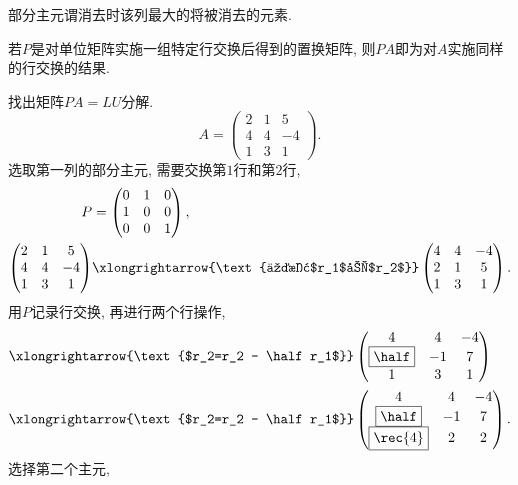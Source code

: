 \documentclass[20pt]{extarticle}
\begin{document}
\begin{definition}
    部分主元谓消去时该列最大的将被消去的元素.
\end{definition}
\begin{theorem}
    若$P$是对单位矩阵实施一组特定行交换后得到的置换矩阵, 则$PA$即为对$A$实施同样的行交换的结果.
\end{theorem}
\begin{ex}
    找出矩阵$PA=LU$分解.
    \[ A = \begin{pmatrix}
        2 & 1 & 5 \\ 4 & 4 & -4 \\ 1 & 3 & 1
    \end{pmatrix}. \]
    选取第一列的部分主元, 需要交换第$1$行和第$2$行,
    \begin{align*}
        P &= \begin{pmatrix}
            0 & 1 & 0 \\ 1 & 0 & 0 \\ 0 & 0 & 1
        \end{pmatrix}, \\
        \begin{pmatrix}
            2 & 1 & 5 \\ 4 & 4 & -4 \\ 1 & 3 & 1
        \end{pmatrix} &\xlongrightarrow{\text{交换$r_1$和$r_2$}} \begin{pmatrix}
            4 & 4 & -4 \\ 2 & 1 & 5 \\ 1 & 3 & 1
        \end{pmatrix}.
    \end{align*}
    用$P$记录行交换, 再进行两个行操作,
    \begin{align*}
        & \xlongrightarrow{\text{$r_2=r_2 - \half r_1$}} \begin{pmatrix}
            4 & 4 & -4 \\ \boxed{\half} & -1 & 7 \\ 1 & 3 & 1
        \end{pmatrix} \\
        & \xlongrightarrow{\text{$r_2=r_2 - \half r_1$}} \begin{pmatrix}
            4 & 4 & -4 \\ \boxed{\half} & -1 & 7 \\ \boxed{\rec{4}} & 2 & 2
        \end{pmatrix}.
    \end{align*}
    选择第二个主元,
    \begin{align*}

\end{align*}
\end{ex}
\end{document}
